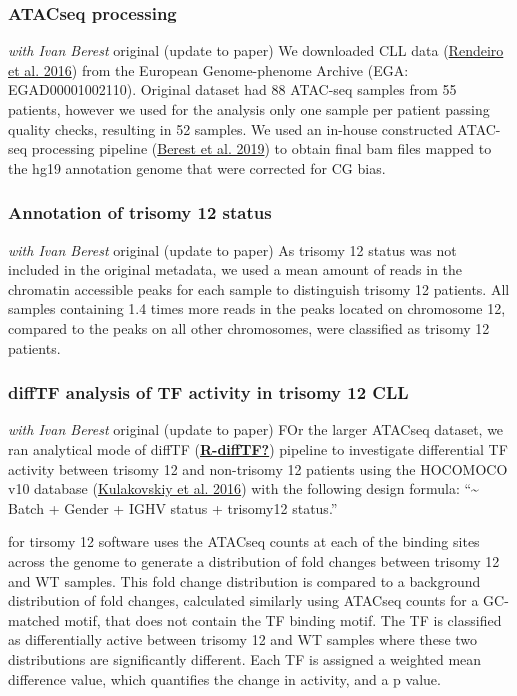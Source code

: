 \documentclass[11pt, a4paper, twosided]{book}
\begin{document}
\hypertarget{atacseq-processing}{%
\subsubsection{ATACseq processing}\label{atacseq-processing}}

\emph{with Ivan Berest} original (update to paper)
We downloaded CLL data (\protect\hyperlink{ref-Rendeiro2016}{Rendeiro et al. 2016}) from the European Genome-phenome Archive (EGA: EGAD00001002110). Original dataset had 88 ATAC-seq samples from 55 patients, however we used for the analysis only one sample per patient passing quality checks, resulting in 52 samples. We used an in-house constructed ATAC-seq processing pipeline (\protect\hyperlink{ref-Berest2019}{Berest et al. 2019}) to obtain final bam files mapped to the hg19 annotation genome that were corrected for CG bias.

\hypertarget{annotation-of-trisomy-12-status}{%
\subsubsection{Annotation of trisomy 12 status}\label{annotation-of-trisomy-12-status}}

\emph{with Ivan Berest} original (update to paper)
As trisomy 12 status was not included in the original metadata, we used a mean amount of reads in the chromatin accessible peaks for each sample to distinguish trisomy 12 patients. All samples containing 1.4 times more reads in the peaks located on chromosome 12, compared to the peaks on all other chromosomes, were classified as trisomy 12 patients.

\hypertarget{difftf-analysis-of-tf-activity-in-trisomy-12-cll}{%
\subsubsection{diffTF analysis of TF activity in trisomy 12 CLL}\label{difftf-analysis-of-tf-activity-in-trisomy-12-cll}}

\emph{with Ivan Berest} original (update to paper)
FOr the larger ATACseq dataset, we ran analytical mode of diffTF (\protect\hyperlink{ref-R-diffTF}{\textbf{R-diffTF?}}) pipeline to investigate differential TF activity between trisomy 12 and non-trisomy 12 patients using the HOCOMOCO v10 database (\protect\hyperlink{ref-HOCOMOCO}{Kulakovskiy et al. 2016}) with the following design formula: ``\textasciitilde{} Batch + Gender + IGHV status + trisomy12 status.''

for tirsomy 12 software uses the ATACseq counts at each of the binding sites across the genome to generate a distribution of fold changes between trisomy 12 and WT samples. This fold change distribution is compared to a background distribution of fold changes, calculated similarly using ATACseq counts for a GC-matched motif, that does not contain the TF binding motif. The TF is classified as differentially active between trisomy 12 and WT samples where these two distributions are significantly different. Each TF is assigned a weighted mean difference value, which quantifies the change in activity, and a p value.
\end{document}
